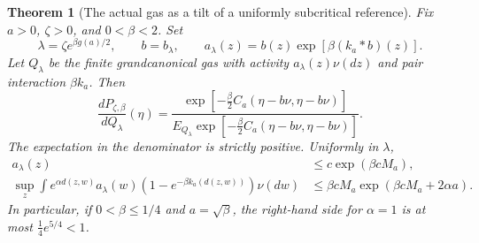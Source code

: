 \documentclass[11pt]{article}
\newtheorem{theorem}{Theorem}[section]
\theoremstyle{remark}\newtheorem{remark}[theorem]{Remark}
\begin{document}
\begin{theorem}[The actual gas as a tilt of a uniformly subcritical reference]
\label{thm:actual-reference-tilt}
Fix $a>0$, $\zeta>0$, and $0<\beta<2$.  Set
\[
 \lambda=\zeta e^{\beta g(a)/2},\qquad b=b_\lambda,\qquad
 a_\lambda(z)=b(z)\exp[\beta(k_a*b)(z)].
\]
Let $Q_\lambda$ be the finite grandcanonical gas with activity
$a_\lambda(z)\nu(dz)$ and pair interaction $\beta k_a$.  Then
\begin{equation}\label{eq:actual-exact-tilt}
 \frac{dP_{\zeta,\beta}}{dQ_\lambda}(\eta)
 =\frac{\exp[-\frac\beta2 C_a(\eta-b\nu,\eta-b\nu)]}
 {E_{Q_\lambda}\exp[-\frac\beta2 C_a(\eta-b\nu,\eta-b\nu)]}.
\end{equation}
The expectation in the denominator is strictly positive.  Uniformly in
$\lambda$,
\begin{align}
 a_\lambda(z)&\le c\exp(\beta cM_a),\label{eq:reference-activity-bound}\\
 \sup_z\int e^{\alpha d(z,w)}a_\lambda(w)
       (1-e^{-\beta k_a(d(z,w))})\nu(dw)
 &\le\beta cM_a\exp(\beta cM_a+2\alpha a).
 \label{eq:reference-influence-bound}
\end{align}
In particular, if $0<\beta\le1/4$ and $a=\sqrt\beta$, the
right-hand side for $\alpha=1$ is at most
$\frac14e^{5/4}<1$.
\end{theorem}
\end{document}
